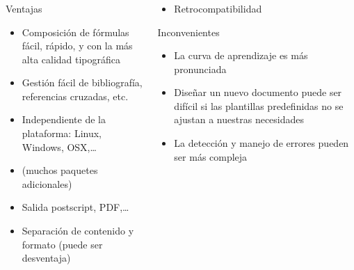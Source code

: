\documentclass{beamer}
\begin{document}
\begin{frame}
  \frametitle{}
  \begin{columns}[T]
    \begin{column}{0.48\textwidth}
      \begin{block}{Ventajas}
        \begin{itemize}
        \item Composici\'on de f\'ormulas f\'acil, r\'apido, y con
          la m\'as alta calidad tipogr\'afica
          \pause
        \item Gesti\'on f\'acil de bibliograf\'ia,
          referencias cruzadas, etc.
          \pause
        \item Independiente de la plataforma: Linux, Windows, OSX,\dots
          \pause
        \item {}
          (muchos paquetes adicionales)
          \pause
        \item Salida postscript, PDF,\dots
          \pause
        \item Separación de contenido y formato (puede ser desventaja)
        \end{itemize}
      \end{block}
    \end{column}
    \pause
    \hfill

    \begin{column}{0.48\textwidth}
      \begin{block}{}
        \begin{itemize}
        \item \alert{Retrocompatibilidad}
        \end{itemize}
      \end{block}

      \pause
      \begin{alertblock}{Inconvenientes}
        \begin{itemize}
        \item La curva de aprendizaje es m\'as pronunciada
          \pause
        \item Dise\~nar un nuevo documento puede ser dif\'icil si las plantillas
          predefinidas no se ajustan a nuestras necesidades
          \pause
        \item La detecci\'on y manejo de errores pueden ser m\'as compleja
      \end{itemize}
      \end{alertblock}
    \end{column}
  \end{columns}
\end{frame}
\end{document}
